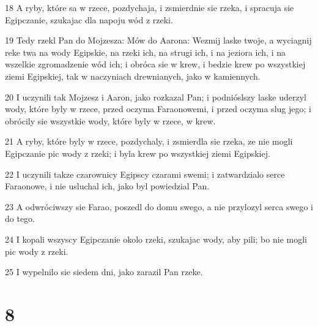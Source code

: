 \par 18 A ryby, które sa w rzece, pozdychaja, i zsmierdnie sie rzeka, i spracuja sie Egipczanie, szukajac dla napoju wód z rzeki.
\par 19 Tedy rzekl Pan do Mojzesza: Mów do Aarona: Wezmij laske twoje, a wyciagnij reke twa na wody Egipskie, na rzeki ich, na strugi ich, i na jeziora ich, i na wszelkie zgromadzenie wód ich; i obróca sie w krew, i bedzie krew po wszystkiej ziemi Egipskiej, tak w naczyniach drewnianych, jako w kamiennych.
\par 20 I uczynili tak Mojzesz i Aaron, jako rozkazal Pan; i podnióslszy laske uderzyl wody, które byly w rzece, przed oczyma Faraonowemi, i przed oczyma slug jego; i obrócily sie wszystkie wody, które byly w rzece, w krew.
\par 21 A ryby, które byly w rzece, pozdychaly, i zsmierdla sie rzeka, ze nie mogli Egipczanie pic wody z rzeki; i byla krew po wszystkiej ziemi Egipskiej.
\par 22 I uczynili takze czarownicy Egipscy czarami swemi; i zatwardzialo serce Faraonowe, i nie usluchal ich, jako byl powiedzial Pan.
\par 23 A odwróciwszy sie Farao, poszedl do domu swego, a nie przylozyl serca swego i do tego.
\par 24 I kopali wszyscy Egipczanie okolo rzeki, szukajac wody, aby pili; bo nie mogli pic wody z rzeki.
\par 25 I wypelnilo sie siedem dni, jako zarazil Pan rzeke.

\chapter{8}

